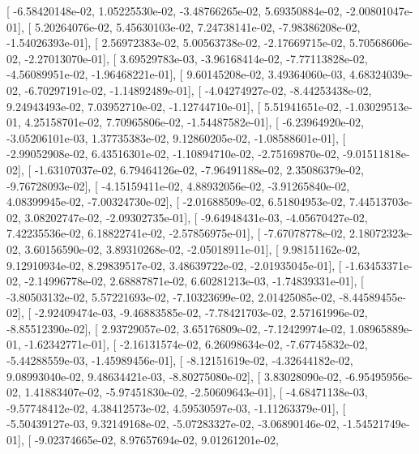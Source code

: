 \documentclass{article}
\begin{document}
       [ -6.58420148e-02,   1.05225530e-02,  -3.48766265e-02,
          5.69350884e-02,  -2.00801047e-01],
       [  5.20264076e-02,   5.45630103e-02,   7.24738141e-02,
         -7.98386208e-02,  -1.54026393e-01],
       [  2.56972383e-02,   5.00563738e-02,  -2.17669715e-02,
          5.70568606e-02,  -2.27013070e-01],
       [  3.69529783e-03,  -3.96168414e-02,  -7.77113828e-02,
         -4.56089951e-02,  -1.96468221e-01],
       [  9.60145208e-02,   3.49364060e-03,   4.68324039e-02,
         -6.70297191e-02,  -1.14892489e-01],
       [ -4.04274927e-02,  -8.44253438e-02,   9.24943493e-02,
          7.03952710e-02,  -1.12744710e-01],
       [  5.51941651e-02,  -1.03029513e-01,   4.25158701e-02,
          7.70965806e-02,  -1.54487582e-01],
       [ -6.23964920e-02,  -3.05206101e-03,   1.37735383e-02,
          9.12860205e-02,  -1.08588601e-01],
       [ -2.99052908e-02,   6.43516301e-02,  -1.10894710e-02,
         -2.75169870e-02,  -9.01511818e-02],
       [ -1.63107037e-02,   6.79464126e-02,  -7.96491188e-02,
          2.35086379e-02,  -9.76728093e-02],
       [ -4.15159411e-02,   4.88932056e-02,  -3.91265840e-02,
          4.08399945e-02,  -7.00324730e-02],
       [ -2.01688509e-02,   6.51804953e-02,   7.44513703e-02,
          3.08202747e-02,  -2.09302735e-01],
       [ -9.64948431e-03,  -4.05670427e-02,   7.42235536e-02,
          6.18822741e-02,  -2.57856975e-01],
       [ -7.67078778e-02,   2.18072323e-02,   3.60156590e-02,
          3.89310268e-02,  -2.05018911e-01],
       [  9.98151162e-02,   9.12910934e-02,   8.29839517e-02,
          3.48639722e-02,  -2.01935045e-01],
       [ -1.63453371e-02,  -2.14996778e-02,   2.68887871e-02,
          6.60281213e-03,  -1.74839331e-01],
       [ -3.80503132e-02,   5.57221693e-02,  -7.10323699e-02,
          2.01425085e-02,  -8.44589455e-02],
       [ -2.92409474e-03,  -9.46883585e-02,  -7.78421703e-02,
          2.57161996e-02,  -8.85512390e-02],
       [  2.93729057e-02,   3.65176809e-02,  -7.12429974e-02,
          1.08965889e-01,  -1.62342771e-01],
       [ -2.16131574e-02,   6.26098634e-02,  -7.67745832e-02,
         -5.44288559e-03,  -1.45989456e-01],
       [ -8.12151619e-02,  -4.32644182e-02,   9.08993040e-02,
          9.48634421e-03,  -8.80275080e-02],
       [  3.83028090e-02,  -6.95495956e-02,   1.41883407e-02,
         -5.97451830e-02,  -2.50609643e-01],
       [ -4.68471138e-03,  -9.57748412e-02,   4.38412573e-02,
          4.59530597e-03,  -1.11263379e-01],
       [ -5.50439127e-03,   9.32149168e-02,  -5.07283327e-02,
         -3.06890146e-02,  -1.54521749e-01],
       [ -9.02374665e-02,   8.97657694e-02,   9.01261201e-02,
\end{document}
